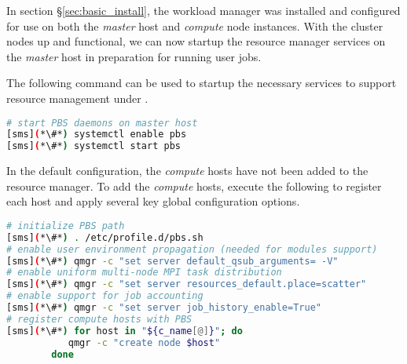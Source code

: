 
In section \S\ref{sec:basic_install}, the \rms{} workload manager was installed
and configured for use on both the {\em master} host and {\em compute} node
instances. With the cluster nodes up and functional, we can now startup the
resource manager services on the {\em master} host in preparation for running
user jobs.

The following command can be used to startup the necessary services to support
resource management under \rms{}.

\begin{lstlisting}[language=bash,keywords={}]
# start PBS daemons on master host
[sms](*\#*) systemctl enable pbs
[sms](*\#*) systemctl start pbs
\end{lstlisting}

In the default configuration, the {\em compute} hosts have not been added to
the \rms{} resource manager. To add the {\em compute} hosts, execute the
following to register each host and apply several key global configuration
options.


\begin{lstlisting}[language=bash,keywords={}]
# initialize PBS path
[sms](*\#*) . /etc/profile.d/pbs.sh
# enable user environment propagation (needed for modules support)
[sms](*\#*) qmgr -c "set server default_qsub_arguments= -V"
# enable uniform multi-node MPI task distribution
[sms](*\#*) qmgr -c "set server resources_default.place=scatter"
# enable support for job accounting
[sms](*\#*) qmgr -c "set server job_history_enable=True"
# register compute hosts with PBS
[sms](*\#*) for host in "${c_name[@]}"; do
           qmgr -c "create node $host"
        done
\end{lstlisting}

